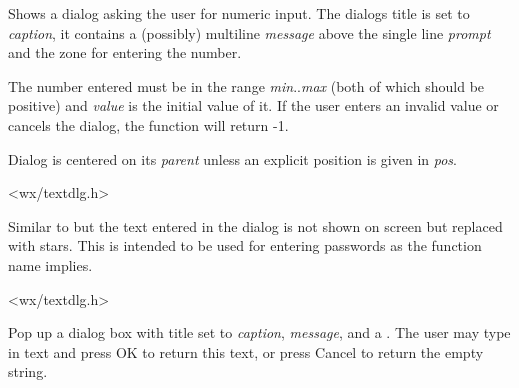 \label{wxgetnumberfromuser}


Shows a dialog asking the user for numeric input. The dialogs title is set to
{\it caption}, it contains a (possibly) multiline {\it message} above the
single line {\it prompt} and the zone for entering the number.

The number entered must be in the range {\it min}..{\it max} (both of which
should be positive) and {\it value} is the initial value of it. If the user
enters an invalid value or cancels the dialog, the function will return -1.

Dialog is centered on its {\it parent} unless an explicit position is given in
{\it pos}.


<wx/textdlg.h>

\label{wxgetpasswordfromuser}


Similar to  but the text entered
in the dialog is not shown on screen but replaced with stars. This is intended
to be used for entering passwords as the function name implies.


<wx/textdlg.h>

\label{wxgettextfromuser}


Pop up a dialog box with title set to {\it caption}, {\it message}, and a
.  The user may type in text and press OK to return this text,
or press Cancel to return the empty string.

